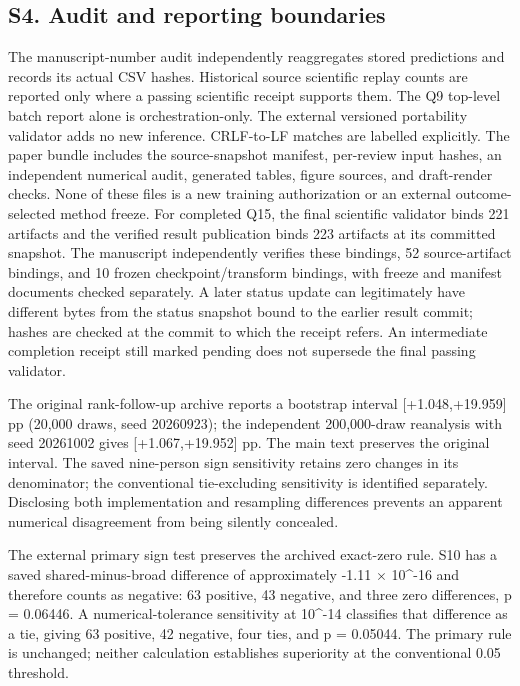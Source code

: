 \documentclass[11pt]{article}
\begin{document}
\subsection*{S4. Audit and reporting boundaries}
The manuscript-number audit independently reaggregates stored predictions and records its actual CSV hashes. Historical source scientific replay counts are reported only where a passing scientific receipt supports them. The Q9 top-level batch report alone is orchestration-only. The external versioned portability validator adds no new inference. CRLF-to-LF matches are labelled explicitly. The paper bundle includes the source-snapshot manifest, per-review input hashes, an independent numerical audit, generated tables, figure sources, and draft-render checks. None of these files is a new training authorization or an external outcome-selected method freeze. For completed Q15, the final scientific validator binds 221 artifacts and the verified result publication binds 223 artifacts at its committed snapshot. The manuscript independently verifies these bindings, 52 source-artifact bindings, and 10 frozen checkpoint/transform bindings, with freeze and manifest documents checked separately. A later status update can legitimately have different bytes from the status snapshot bound to the earlier result commit; hashes are checked at the commit to which the receipt refers. An intermediate completion receipt still marked pending does not supersede the final passing validator.

The original rank-follow-up archive reports a bootstrap interval [+1.048,+19.959] pp (20,000 draws, seed 20260923); the independent 200,000-draw reanalysis with seed 20261002 gives [+1.067,+19.952] pp. The main text preserves the original interval. The saved nine-person sign sensitivity retains zero changes in its denominator; the conventional tie-excluding sensitivity is identified separately. Disclosing both implementation and resampling differences prevents an apparent numerical disagreement from being silently concealed.

The external primary sign test preserves the archived exact-zero rule. S10 has a saved shared-minus-broad difference of approximately -1.11 $\times$ 10\textasciicircum{}-16 and therefore counts as negative: 63 positive, 43 negative, and three zero differences, p = 0.06446. A numerical-tolerance sensitivity at 10\textasciicircum{}-14 classifies that difference as a tie, giving 63 positive, 42 negative, four ties, and p = 0.05044. The primary rule is unchanged; neither calculation establishes superiority at the conventional 0.05 threshold.
\end{document}
